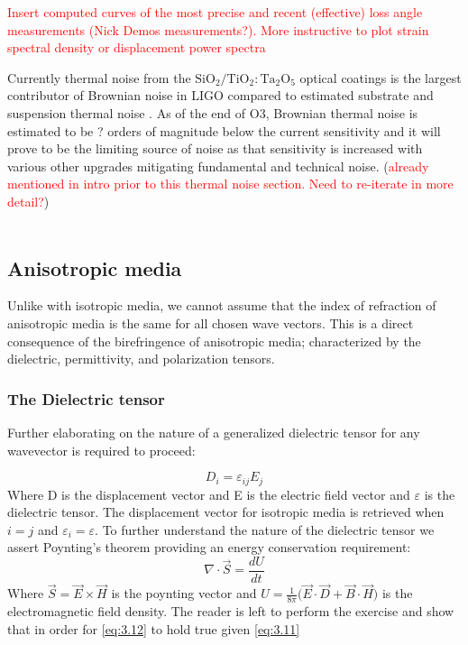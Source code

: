 \textcolor{red}{Insert computed curves of the most precise and recent (effective) loss angle measurements (Nick Demos measurements?). More instructive to plot strain spectral density or displacement power spectra}

\noindent Currently thermal noise from the $\mathrm{SiO_2}/\mathrm{TiO_2:Ta_2O_5}$ optical coatings is the largest contributor of Brownian noise in LIGO compared to estimated substrate and suspension thermal noise \cite{Harry:06}. As of the end of O3, Brownian thermal noise is estimated to be ? orders of magnitude below the current sensitivity and it will prove to be the limiting source of noise as that sensitivity is increased with various other upgrades mitigating fundamental and technical noise. (\textcolor{red}{already mentioned in intro prior to this thermal noise section. Need to re-iterate in more detail?})
\\
\\
\subsection{Anisotropic media}
Unlike with isotropic media, we cannot assume that the index of refraction of anisotropic media is the same for all chosen wave vectors. This is a direct consequence of the birefringence of anisotropic media; characterized by the dielectric, permittivity, and polarization tensors.

\subsubsection{The Dielectric tensor}
Further elaborating on the nature of a generalized dielectric tensor for any wavevector is required to proceed:

\begin{equation}\label{eq:3.11}
D_i = \varepsilon_{ij}E_j
\end{equation}
Where D is the displacement vector and E is the electric field vector and $\varepsilon$ is the dielectric tensor. The displacement vector for isotropic media is retrieved when $i = j$ and $\varepsilon_i = \varepsilon$. To further understand the nature of the dielectric tensor we assert Poynting's theorem providing an energy conservation requirement:
\begin{equation}\label{eq:3.12}
\nabla \cdot \vec{S} = \frac{dU}{dt}
\end{equation}
Where $\vec{S} = \vec{E} \times \vec{H}$ is the poynting vector and $U = \frac{1}{8 \pi} \big( \vec{E} \cdot \vec{D} + \vec{B} \cdot \vec{H} \big)$ is the electromagnetic field density. The reader is left to perform the exercise and show that in order for \ref{eq:3.12} to hold true given \ref{eq:3.11}

